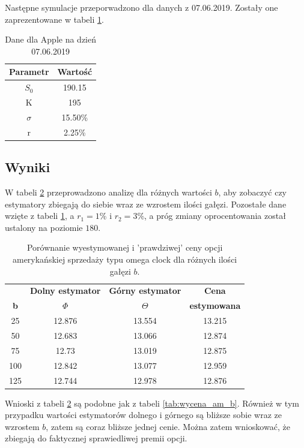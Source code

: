 \documentclass[]{pwr_wmat_praca_dyplomowa}
\theoremstyle{plain}
\numberwithin{theorem}{chapter}
\theoremstyle{definition}
\numberwithin{theorem}{chapter}
\begin{document}
Następne symulacje przeporwadzono dla danych z 07.06.2019. Zostały one zaprezentowane w tabeli \ref{tab:dane_apple}.

\begin{table}[h!]
\caption{Dane dla Apple na dzień 07.06.2019}
\centering
\begin{tabular}{|c|c|}
\hline                       
\textbf{Parametr} & \textbf{Wartość} \\
\hline
$S_0$&190.15\\
K&195\\ %
$\sigma$&15.50\%\\ %
r&2.25\%\\ %
\hline 
\end{tabular}
\label{tab:dane_apple} 
\end{table}

\subsection{Wyniki}

W tabeli \ref{tab:wycena_apple_b} przeprowadzono analizę dla różnych wartości $b$, aby zobaczyć czy estymatory zbiegają do siebie wraz ze wzrostem ilości gałęzi. Pozostałe dane wzięte z tabeli \ref{tab:dane_apple}, a $r_1 = 1$\% i $r_2 = 3$\%, a próg zmiany oprocentowania został ustalony na poziomie $180$.

\begin{table}[h!]
\caption{Porównanie wyestymowanej i 'prawdziwej' ceny opcji amerykańskiej sprzedaży typu omega clock dla różnych ilości gałęzi $b$.}
\centering
\begin{tabular}{cccc}
\hline                       
 & \textbf{Dolny estymator} & \textbf{Górny estymator} & \textbf{Cena}\\
\textbf{b} & \textbf{$\Phi$} & \textbf{$\Theta$} & \textbf{estymowana}\\
\hline
25&12.876&13.554&13.215\\
50&12.683&13.066&12.874\\
75&12.73&13.019&12.875\\
100&12.842&13.077&12.959\\
125&12.744&12.978&12.876\\
\hline 
\end{tabular}
\label{tab:wycena_apple_b} 
\end{table}

Wnioski z tabeli \ref{tab:wycena_apple_b} są podobne jak z tabeli \ref{tab:wycena_am_b}. Również w tym przypadku wartości estymatorów dolnego i górnego są bliższe sobie wraz ze wzrostem $b$, zatem są coraz bliższe jednej cenie. Można zatem wnioskować, że zbiegają do faktycznej sprawiedliwej premii opcji.
\end{document}
